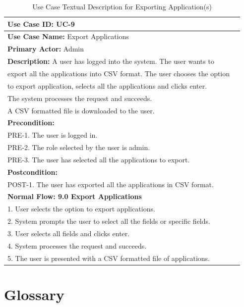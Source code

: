 \documentclass[fontsize=12pt,paper=letter,twoside]{scrartcl}
\begin{document}
\newpage
\begin{table}[!htb]
\begin{center}
\begin{tabular}{|l|l|}
\hline
\textbf{Use Case ID:} UC-9 \\ \hline
\textbf{Use Case Name:} Export Applications \\ \hline
\textbf {Primary Actor:} Admin \\ \hline
\textbf{Description:} A user has logged into the system. The user wants to \\export all the applications into CSV format. The user chooses the option \\to export application, selects all the applications and clicks enter. \\The system processes the request and succeeds. \\A CSV formatted file is downloaded to the user.\\ \hline
\textbf{Precondition:}
\\ PRE-1. The user is logged in.
\\ PRE-2. The role selected by the user is admin.
\\ PRE-3. The user has selected all the applications to export.\\ \hline
\textbf{Postcondition:}
\\ POST-1. The user has exported all the applications in CSV format. \\ \hline
\textbf{Normal Flow: 9.0 Export Applications}
\\ 1. User selects the option to export applications.
\\ 2. System prompts the user to select all the fields or specific fields.
\\ 3. User selects all fields and clicks enter.
\\ 4. System processes the request and succeeds.
\\ 5. The user is presented with a CSV formatted file of applications. \\ \hline
\end{tabular}
\end{center}
\caption {Use Case Textual Description for Exporting Application(s)}
\label{tbl:uc9td}
\end{table}

\newpage
\section{Glossary} \label{app:defns}
\end{document}
